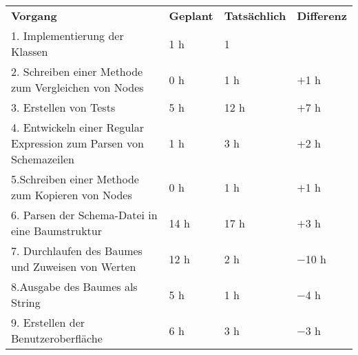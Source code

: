\begin{tabular}{llll}
\rowcolor{heading}\textbf{Vorgang} & \textbf{Geplant} & \textbf{Tatsächlich} & \textbf{Differenz} \\
1. Implementierung der Klassen & 1 h & 1 &  \\
\rowcolor{odd}2. Schreiben einer Methode zum Vergleichen von Nodes & 0 h & 1 h & $+$1 h\\
3. Erstellen von Tests & 5 h   & 12 h   & $+$7 h \\
\rowcolor{odd}4. Entwickeln einer Regular Expression zum Parsen von Schemazeilen & 1 h & 3 h  & +2 h\\
5.Schreiben einer Methode zum Kopieren von Nodes & 0 h & 1 h & $+$1 h \\
\rowcolor{odd}6. Parsen der Schema-Datei in eine Baumstruktur & 14 h & 17 h & $+$3 h \\
7. Durchlaufen des Baumes und Zuweisen von Werten & 12 h & 2 h & $-$10 h \\
\rowcolor{odd}8.Ausgabe des Baumes als String & 5 h & 1 h & $-$4 h \\
9. Erstellen der Benutzeroberfläche & 6 h & 3 h & $-$3 h\\
\end{tabular}
